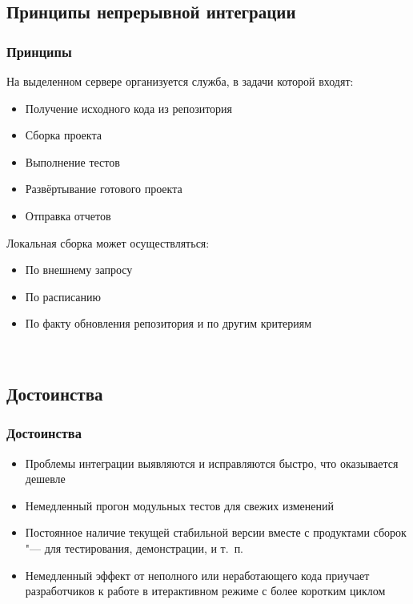 \documentclass{../industrial-development}
\begin{document}
\subsection {Принципы непрерывной интеграции}

\begin{frame} \frametitle{Принципы}
	\begin{block}{На выделенном сервере организуется служба, в задачи которой входят:}
		\begin{itemize}
			\item Получение исходного кода из репозитория
			\item Сборка проекта
			\item Выполнение тестов
			\item Развёртывание готового проекта
			\item Отправка отчетов
		\end{itemize}
	\end{block}
	\begin{block}{Локальная сборка может осуществляться:}
		\begin{itemize}
		\item По внешнему запросу
		\item По расписанию
		\item По факту обновления репозитория и по другим критериям
		\end{itemize}
	\end{block}
\end{frame}
\lecturenotes
~\cite{Custis_Continuous Integration}

\subsection {Достоинства}

\begin{frame} \frametitle{Достоинства}
	\begin{block}{}
			\begin{itemize}
			\item Проблемы интеграции выявляются и исправляются быстро,
			что оказывается дешевле
			\item Немедленный прогон модульных тестов для свежих
			изменений
			\item Постоянное наличие текущей стабильной версии вместе с
			продуктами сборок "--- для тестирования, демонстрации, и т.~п.
			\item Немедленный эффект от неполного или неработающего
			кода приучает разработчиков к работе в итерактивном
			режиме с более коротким циклом
		\end{itemize}
	\end{block}
\end{frame}
\end{document}
